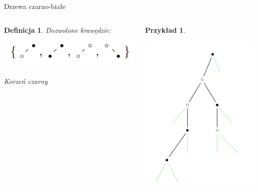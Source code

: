 \documentclass[final]{beamer}
\theoremstyle{bluetheorem}
\theoremstyle{bluetheorem}
\newtheorem{mydefinition}[mytheorem]{Definicja}
\theoremstyle{greentheorem}
\newtheorem{myexample}[mytheorem]{Przykład}
\begin{document}
\begin{frame}{Drzewa czarno-białe}
    \begin{columns}
        \begin{mydefinition}
            Dozwolone krawędzie: \includegraphics{bw.png}

            Korzeń czarny
        \end{mydefinition}

        \begin{myexample}
            \begin{center}
                \includegraphics{bw_001.png}
            \end{center}
        \end{myexample}
    \end{columns}
\end{frame}
\end{document}
